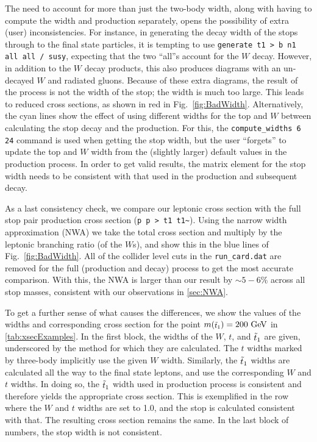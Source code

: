 \documentclass[a4paper,12pt]{article}
\newcommand{\gev}{~\text{GeV}}
\def\mstop{\ensuremath{m({\footnotesize \stopone})}}
\def\stopone{\ensuremath{\mathchoice%
      {\displaystyle\raise.0ex\hbox{$\displaystyle\tilde t_1$}}%
         {\textstyle\raise-.2ex\hbox{$\textstyle\tilde t_1$}}%
       {\scriptstyle\raise.0ex\hbox{$\scriptstyle\tilde t_1$}}%
 {\scriptscriptstyle\raise.0ex\hbox{$\scriptscriptstyle\tilde t_1$}}}}
\begin{document}
The need to account for more than just the two-body width, along with having to compute the width and production separately, opens the possibility of extra (user) inconsistencies. For instance, in generating the decay width of the stops through to the final state particles, it is tempting to use
\texttt{generate t1 > b n1 all all / susy},
expecting that the two ``all''s account for the $W$ decay. However, in addition to the $W$ decay products, this also produces diagrams with an un-decayed $W$ and radiated gluons. Because of these extra diagrams, the result of the process is not the width of the stop; the width is much too large. This leads to reduced cross sections, as shown in red in Fig.~\ref{fig:BadWidth}. Alternatively, the cyan lines show the effect of using different widths for the top and $W$ between calculating the stop decay and the production. For this, the \texttt{compute\_widths 6 24} command is used when getting the stop width, but the user ``forgets'' to update the top and $W$ width from the (slightly larger) default values in the production process. In order to get valid results, the matrix element for the stop width needs to be consistent with that used in the production and subsequent decay.

As a last consistency check, we compare our leptonic cross section with the full stop pair production cross section (\texttt{p p > t1 t1\~}). Using the narrow width approximation (NWA) we take the total cross section and multiply by the leptonic branching ratio (of the $W$s), and show this in the blue lines of Fig.~\ref{fig:BadWidth}. All of the collider level cuts in the \texttt{run\_card.dat} are removed for the full (production and decay) process to get the most accurate comparison. With this, the NWA is larger than our result by $\sim5-6\%$ across all stop masses, consistent with our observations in \cref{sec:NWA}. 

To get a further sense of what causes the differences, we show the values of the widths and corresponding cross section for the point $\mstop = 200\gev$ in \cref{tab:xsecExamples}. In the first block, the widths of the $W$, $t$, and $\stopone$ are given, underscored by the method for which they are calculated. The $t$ widths marked by three-body implicitly use the given $W$ width. Similarly, the $\stopone$ widths are calculated all the way to the final state leptons, and use the corresponding $W$ and $t$ widths. In doing so, the $\stopone$ width used in production process is consistent and therefore yields the appropriate cross section. This is exemplified in the row where the $W$ and $t$ widths are set to 1.0, and the stop is calculated consistent with that. The resulting cross section remains the same.  In the last block of numbers, the stop width is not consistent. 
\end{document}
